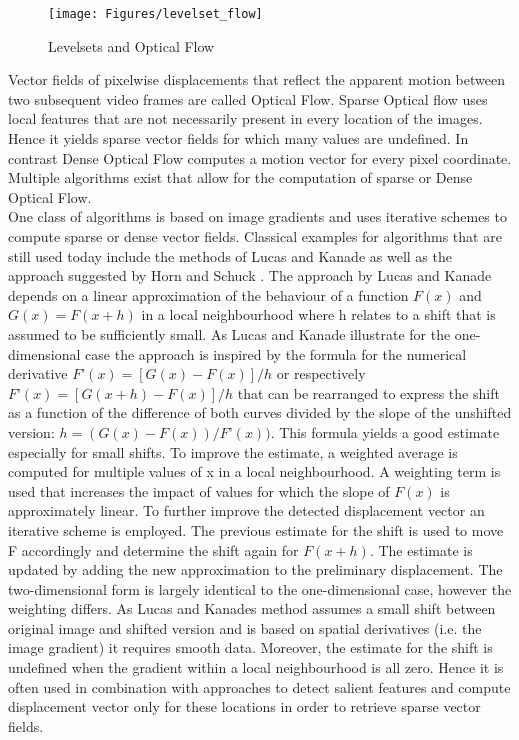 \begin{figure}[!htb]
\centering
\texttt{[image: Figures/levelset\_flow]}
\decoRule
\caption[Levelsets and Optical Flow]{Levelsets and Optical Flow}
\label{fig:levelset_flow}
\end{figure}
Vector fields of pixelwise displacements that reflect the apparent motion between two subsequent video frames are called Optical Flow. Sparse Optical flow uses local features that are not necessarily present in every location of the images. Hence it yields sparse vector fields for which many values are undefined. In contrast Dense Optical Flow computes a motion vector for every pixel coordinate. Multiple algorithms exist that allow for the computation of sparse or Dense Optical Flow. \\
One class of algorithms is based on image gradients and uses iterative schemes to compute sparse or dense vector fields. Classical examples for algorithms that are still used today include the methods of Lucas and Kanade \parencite*{ lucas1981iterative} as well as  the approach suggested by Horn and Schuck \parencite*{ horn1981determining}. The approach by Lucas and Kanade \parencite*{ lucas1981iterative} depends on a linear approximation of the behaviour of a function $F(x)$ and $G(x) = F(x+h)$ in a local neighbourhood where h relates to a shift that is assumed to be sufficiently small. As Lucas and Kanade \parencite*{ lucas1981iterative}  illustrate for the one-dimensional case the approach is inspired by the formula for the numerical derivative $F’(x) = [G(x)-F(x)]/h$ or respectively $F’(x) = [G(x+h)-F(x)]/h$ that can be rearranged to express the shift as a function of the difference of both curves divided by the slope of the unshifted version: $h = (G(x)-F(x))/F’(x))$. This formula yields a good estimate especially for small shifts. To improve the estimate, a weighted average is computed for multiple values of x in a local neighbourhood. A weighting term is used that increases the impact of values for which the slope of $F(x)$ is approximately linear. To further improve the detected displacement vector an iterative scheme is employed. The previous estimate for the shift is used to move F accordingly and determine the shift again for $F(x+h)$. The estimate is updated by adding the new approximation to the preliminary displacement.  The two-dimensional form is largely identical to the one-dimensional case, however the weighting differs. As Lucas and Kanades \parencite*{ lucas1981iterative} method assumes a small shift between original image and shifted version and is based on spatial derivatives (i.e. the image gradient) it requires smooth data. Moreover, the estimate for the shift is undefined when the gradient within a local neighbourhood is all zero. Hence it is often used in combination with approaches to detect salient features and compute displacement vector only for these locations in order to retrieve sparse vector fields.\\
